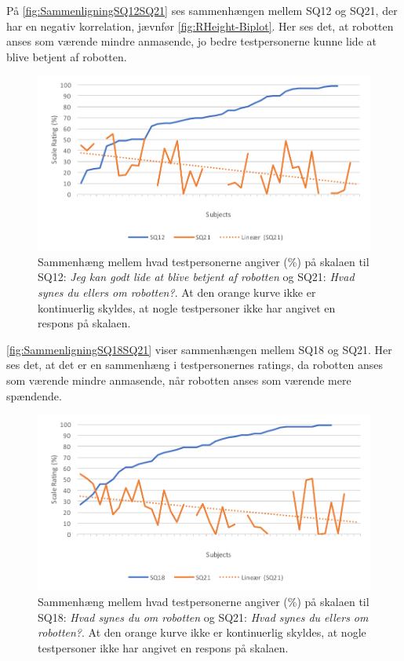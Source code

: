 \noindent
%
På \autoref{fig:SammenligningSQ12SQ21} ses sammenhængen mellem SQ12 og SQ21, der har en negativ korrelation, jævnfør \autoref{fig:RHeight-Biplot}. Her ses det, at robotten anses som værende mindre anmasende, jo bedre testpersonerne kunne lide at blive betjent af robotten.
%
\begin{figure}[H]
	\centering
	\includegraphics[width=\textwidth]{Figure/Korrelationsgrafer/SQ12+SQ21}
	\caption{Sammenhæng mellem hvad testpersonerne angiver (\%) på skalaen til SQ12: \textit{Jeg kan godt lide at blive betjent af robotten} og SQ21: \textit{Hvad synes du ellers om robotten?}. At den orange kurve ikke er kontinuerlig skyldes, at nogle testpersoner ikke har angivet en respons på skalaen.}
	\label{fig:SammenligningSQ12SQ21}
\end{figure}
\noindent
%
\autoref{fig:SammenligningSQ18SQ21} viser sammenhængen mellem SQ18 og SQ21. Her ses det, at det er en sammenhæng i testpersonernes ratings, da robotten anses som værende mindre anmasende, når robotten anses som værende mere spændende.
%
\begin{figure}[H]
	\centering
	\includegraphics[width=\textwidth]{Figure/Korrelationsgrafer/SQ18+SQ21}
	\caption{Sammenhæng mellem hvad testpersonerne angiver (\%) på skalaen til SQ18: \textit{Hvad synes du om robotten} og SQ21: \textit{Hvad synes du ellers om robotten?}. At den orange kurve ikke er kontinuerlig skyldes, at nogle testpersoner ikke har angivet en respons på skalaen.}
	\label{fig:SammenligningSQ18SQ21}
\end{figure}
